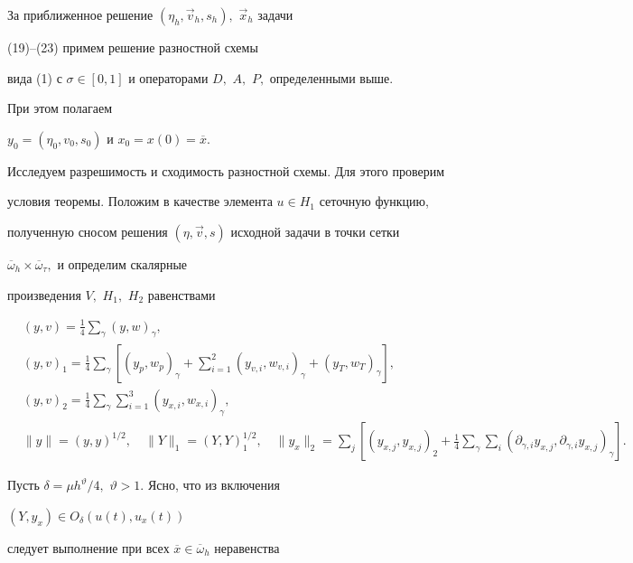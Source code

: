 За приближенное решение $(\eta_h, \Vec v_h, s_h),$ $\Vec x_h$ задачи 


(19)--(23) примем решение разностной схемы 


вида (1) с $\sigma\in[0,1]$ и операторами $D,$ $A,$ $P,$ определенными выше. 


При этом полагаем \linebreak




$y_0=(\eta_0,v_0,s_0)$ и $x_0=x(0)=\overline x.$ 


 


Исследуем разрешимость и сходимость разностной схемы. Для этого проверим 


условия теоремы. Положим в качестве элемента $u\in H_1$ сеточную функцию, 


полученную сносом решения $(\eta,\Vec v,s)$ исходной задачи в точки сетки 


$\overline \omega_h \times \overline \omega_\tau,$ и определим скалярные 


произведения $V,$ $H_1,$ $H_2$ равенствами 


\begin{align*} 


&(y,v)=\frac14\sum_\gamma(y,w)_\gamma, \\ 


&(y,v)_1=\frac14\sum_\gamma\left[(y_p,w_p)_\gamma+\sum^2_{i=1} 


 (y_{v,i},w_{v,i})_\gamma+(y_T,w_T)_\gamma\right],\\ 


&(y,v)_2=\frac14\sum_\gamma\sum^3_{i=1}(y_{x,i},w_{x,i})_\gamma, \\


&\|y\|=(y,y)^{1/2}, \quad \|Y\|_1=(Y,Y)_1^{1/2},\quad 


 \|y_x\|_2=\sum_j\left[(y_{x,j},y_{x,j})_2+\frac14\sum_\gamma\sum_i 


 (\partial_{\gamma,i}y_{x,j},\partial_{\gamma,i}y_{x,j})_\gamma 


 \right] .


\end{align*} 


Пусть $\delta=\mu h^\vartheta/4,$ $\vartheta>1.$ Ясно, что из включения 


$(Y,y_x)\in O_\delta(u(t),u_x(t))$ 


следует выполнение при всех $\overline x \in \overline \omega_h$ неравенства 


